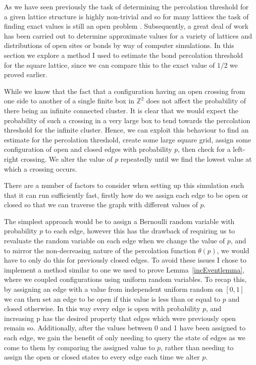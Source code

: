 \documentclass[a4paper,11pt]{article}
\theoremstyle{definition}
\newcommand{\ints}{\mathbb{Z}}
\begin{document}
As we have seen previously the task of determining the percolation threshold for a given lattice structure is highly non-trivial and so for many lattices the task of finding exact values is still an open problem \cite{StoverThreshold}. Subsequently, a great deal of work has been carried out to determine approximate values for a variety of lattices and distributions of open sites or bonds by way of computer simulations. In this section we explore a method I used to estimate the bond percolation threshold for the square lattice, since we can compare this to the exact value of $1/2$ we proved earlier. 

While we know that the fact that a configuration having an open crossing from one side to another of a single finite box in $\ints^2$ does not affect the probability of there being an infinite connected cluster. It is clear that we would expect the probability of such a crossing in a very large box to tend towards the percolation threshold for the infinite cluster. Hence, we can exploit this behaviour to find an estimate for the percolation threshold, create some large square grid, assign some configuration of open and closed edges with probability $p$, then check for a left-right crossing. We alter the value of $p$ repeatedly until we find the lowest value at which a crossing occurs.

There are a number of factors to consider when setting up this simulation such that it can run sufficiently fast, firstly how do we assign each edge to be open or closed so that we can traverse the graph with different values of $p$.

The simplest approach would be to assign a Bernoulli random variable with probability $p$ to each edge, however this has the drawback of requiring us to revaluate the random variable on each edge when we change the value of $p$, and to mirror the non-decreasing nature of the percolation function $\theta(p)$, we would have to only do this for previously closed edges. To avoid these issues I chose to implement a method similar to one we used to prove Lemma~\ref{incEventlemma}, where we coupled configurations using uniform random variables. To recap this, by assigning an edge with a value from independent uniform random on $[0,1]$ we can then set an edge to be open if this value is less than or equal to $p$ and closed otherwise. In this way every edge is open with probability $p$, and increasing p has the desired property that edges which were previously open remain so. Additionally, after the values between 0 and 1 have been assigned to each edge, we gain the benefit of only needing to query the state of edges as we come to them by comparing the assigned value to $p$, rather than needing to assign the open or closed states to every edge each time we alter $p$.
\end{document}
